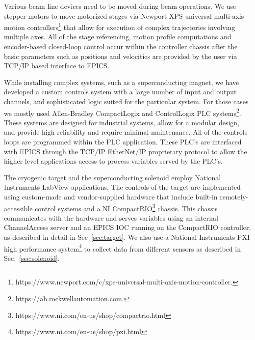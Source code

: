Various beam line devices need to be moved during beam operations. We use stepper motors to move motorized stages via Newport XPS universal multi-axis motion controllers\footnote{https://www.newport.com/c/xps-universal-multi-axis-motion-controller.} that allow for execution of complex trajectories involving multiple axes. All of the stage referencing, motion profile computations and encoder-based closed-loop control occur within the controller chassis after the basic parameters such as positions and velocities are provided by the user via TCP/IP based interface to EPICS.   

While installing complex systems, such as a superconducting magnet, we have developed a custom controls system with a large number of input and output channels, and sophisticated logic suited for the particular system. For those cases we mostly  used Allen-Bradley CompactLogix and ControlLogix PLC systems\footnote{https://ab.rockwellautomation.com.}. These systems are designed for industrial systems, allow for a modular design, and provide high reliability and require minimal maintenance. All of the controls loops are programmed within the PLC application. These PLC's are interfaced with EPICS through the TCP/IP EtherNet/IP proprietary protocol to allow the higher level applications access to process variables served by the PLC's.  

The cryogenic target and the superconducting solenoid employ National Instruments LabView applications. The controls of the target are implemented using custom-made and vendor-supplied hardware that include built-in remotely-accessible control systems and a NI CompactRIO\footnote{https://www.ni.com/en-us/shop/compactrio.html} chassis. This chassis communicates with the hardware and serves variables using an internal ChannelAccess server and an EPICS IOC running on the CompactRIO controller, as described in detail in Sec~\ref{sec:target}. We also use a National Instruments PXI high performance system\footnote{https://www.ni.com/en-us/shop/pxi.html} to collect data from different sensors as described in Sec.~\ref{sec:solenoid}. 

